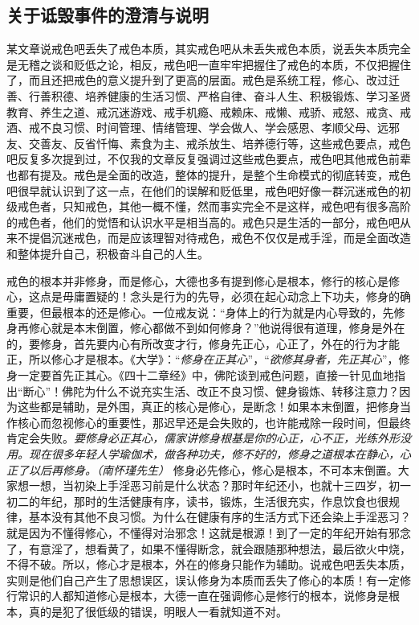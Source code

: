\subsection{关于诋毁事件的澄清与说明}

某文章说戒色吧丢失了戒色本质，其实戒色吧从未丢失戒色本质，说丢失本质完全是无稽之谈和贬低之论，相反，戒色吧一直牢牢把握住了戒色的本质，不仅把握住了，而且还把戒色的意义提升到了更高的层面。戒色是系统工程，修心、改过迁善、行善积德、培养健康的生活习惯、严格自律、奋斗人生、积极锻炼、学习圣贤教育、养生之道、戒沉迷游戏、戒手机瘾、戒赖床、戒懒、戒骄、戒怒、戒贪、戒酒、戒不良习惯、时间管理、情绪管理、学会做人、学会感恩、孝顺父母、远邪友、交善友、反省忏悔、素食为主、戒杀放生、培养德行等，这些戒色要点，戒色吧反复多次提到过，不仅我的文章反复强调过这些戒色要点，戒色吧其他戒色前辈也都有提及。戒色是全面的改造，整体的提升，是整个生命模式的彻底转变，戒色吧很早就认识到了这一点，在他们的误解和贬低里，戒色吧好像一群沉迷戒色的初级戒色者，只知戒色，其他一概不懂，然而事实完全不是这样，戒色吧有很多高阶的戒色者，他们的觉悟和认识水平是相当高的。戒色只是生活的一部分，戒色吧从来不提倡沉迷戒色，而是应该理智对待戒色，戒色不仅仅是戒手淫，而是全面改造和整体提升自己，积极奋斗自己的人生。

戒色的根本并非修身，而是修心，大德也多有提到修心是根本，修行的核心是修心，这点是毋庸置疑的！念头是行为的先导，必须在起心动念上下功夫，修身的确重要，但最根本的还是修心。一位戒友说：“身体上的行为就是内心导致的，先修身再修心就是本末倒置，修心都做不到如何修身？”他说得很有道理，修身是外在的，要修身，首先要内心有所改变才行，修身先正心，心正了，外在的行为才能正，所以修心才是根本。《大学》：“\textit{修身在正其心}”，“\textit{欲修其身者，先正其心}”，修身一定要首先正其心。《四十二章经》中，佛陀谈到戒色问题，直接一针见血地指出“断心”！佛陀为什么不说充实生活、改正不良习惯、健身锻炼、转移注意力？因为这些都是辅助，是外围，真正的核心是修心，是断念！如果本末倒置，把修身当作核心而忽视修心的重要性，那迟早还是会失败的，也许能戒除一段时间，但最终肯定会失败。\textit{要修身必正其心，儒家讲修身根基是你的心正，心不正，光练外形没用。现在很多年轻人学瑜伽术，做各种功夫，修不好的，修身之道根本在静心，心正了以后再修身。（南怀瑾先生）} 修身必先修心，修心是根本，不可本末倒置。大家想一想，当初染上手淫恶习前是什么状态？那时年纪还小，也就十三四岁，初一初二的年纪，那时的生活健康有序，读书，锻炼，生活很充实，作息饮食也很规律，基本没有其他不良习惯。为什么在健康有序的生活方式下还会染上手淫恶习？就是因为不懂得修心，不懂得对治邪念！这就是根源！到了一定的年纪开始有邪念了，有意淫了，想看黄了，如果不懂得断念，就会跟随那种想法，最后欲火中烧，不得不破。所以，修心才是根本，外在的修身只能作为辅助。说戒色吧丢失本质，实则是他们自己产生了思想误区，误认修身为本质而丢失了修心的本质！有一定修行常识的人都知道修心是根本，大德一直在强调修心是修行的根本，说修身是根本，真的是犯了很低级的错误，明眼人一看就知道不对。


